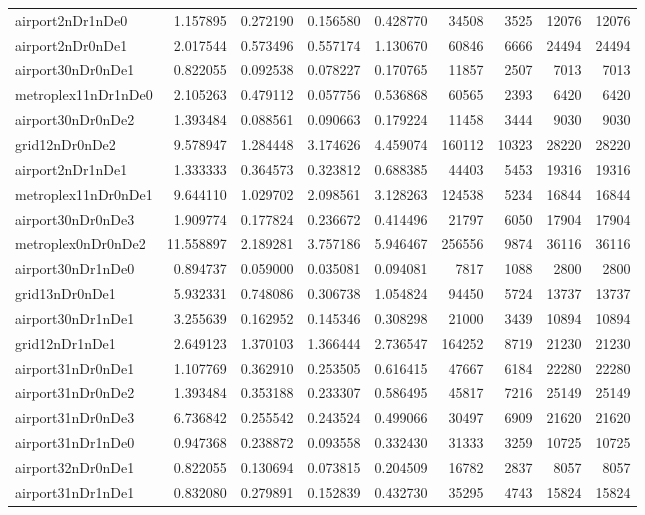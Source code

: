 \begin{longtable}{|l|r|r|r|r|r|r|r|r|}
airport2nDr1nDe0 & 1.157895 & 0.272190 & 0.156580 & 0.428770 & 34508 & 3525 & 12076 & 12076 \\
airport2nDr0nDe1 & 2.017544 & 0.573496 & 0.557174 & 1.130670 & 60846 & 6666 & 24494 & 24494 \\
airport30nDr0nDe1 & 0.822055 & 0.092538 & 0.078227 & 0.170765 & 11857 & 2507 & 7013 & 7013 \\
metroplex11nDr1nDe0 & 2.105263 & 0.479112 & 0.057756 & 0.536868 & 60565 & 2393 & 6420 & 6420 \\
airport30nDr0nDe2 & 1.393484 & 0.088561 & 0.090663 & 0.179224 & 11458 & 3444 & 9030 & 9030 \\
grid12nDr0nDe2 & 9.578947 & 1.284448 & 3.174626 & 4.459074 & 160112 & 10323 & 28220 & 28220 \\
airport2nDr1nDe1 & 1.333333 & 0.364573 & 0.323812 & 0.688385 & 44403 & 5453 & 19316 & 19316 \\
metroplex11nDr0nDe1 & 9.644110 & 1.029702 & 2.098561 & 3.128263 & 124538 & 5234 & 16844 & 16844 \\
airport30nDr0nDe3 & 1.909774 & 0.177824 & 0.236672 & 0.414496 & 21797 & 6050 & 17904 & 17904 \\
metroplex0nDr0nDe2 & 11.558897 & 2.189281 & 3.757186 & 5.946467 & 256556 & 9874 & 36116 & 36116 \\
airport30nDr1nDe0 & 0.894737 & 0.059000 & 0.035081 & 0.094081 & 7817 & 1088 & 2800 & 2800 \\
grid13nDr0nDe1 & 5.932331 & 0.748086 & 0.306738 & 1.054824 & 94450 & 5724 & 13737 & 13737 \\
airport30nDr1nDe1 & 3.255639 & 0.162952 & 0.145346 & 0.308298 & 21000 & 3439 & 10894 & 10894 \\
grid12nDr1nDe1 & 2.649123 & 1.370103 & 1.366444 & 2.736547 & 164252 & 8719 & 21230 & 21230 \\
airport31nDr0nDe1 & 1.107769 & 0.362910 & 0.253505 & 0.616415 & 47667 & 6184 & 22280 & 22280 \\
airport31nDr0nDe2 & 1.393484 & 0.353188 & 0.233307 & 0.586495 & 45817 & 7216 & 25149 & 25149 \\
airport31nDr0nDe3 & 6.736842 & 0.255542 & 0.243524 & 0.499066 & 30497 & 6909 & 21620 & 21620 \\
airport31nDr1nDe0 & 0.947368 & 0.238872 & 0.093558 & 0.332430 & 31333 & 3259 & 10725 & 10725 \\
airport32nDr0nDe1 & 0.822055 & 0.130694 & 0.073815 & 0.204509 & 16782 & 2837 & 8057 & 8057 \\
airport31nDr1nDe1 & 0.832080 & 0.279891 & 0.152839 & 0.432730 & 35295 & 4743 & 15824 & 15824 \\

\end{longtable}
